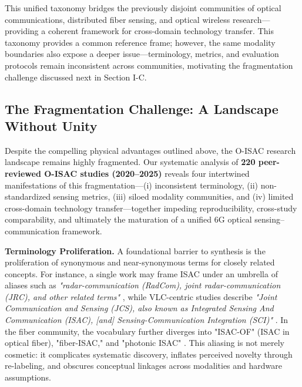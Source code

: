 \documentclass[lettersize,journal]{IEEEtran}
\begin{document}
This unified taxonomy bridges the previously disjoint communities of optical communications, distributed fiber sensing, and optical wireless research---providing a coherent framework for cross-domain technology transfer. This taxonomy provides a common reference frame; however, the same modality boundaries also expose a deeper issue---terminology, metrics, and evaluation protocols remain inconsistent across communities, motivating the fragmentation challenge discussed next in Section I-C.

\subsection{The Fragmentation Challenge: A Landscape Without Unity}

Despite the compelling physical advantages outlined above, the O-ISAC research landscape remains highly fragmented. Our systematic analysis of \textbf{220 peer-reviewed O-ISAC studies (2020--2025)} reveals four intertwined manifestations of this fragmentation---(i) inconsistent terminology, (ii) non-standardized sensing metrics, (iii) siloed modality communities, and (iv) limited cross-domain technology transfer---together impeding reproducibility, cross-study comparability, and ultimately the maturation of a unified 6G optical sensing--communication framework.

\textbf{Terminology Proliferation.} A foundational barrier to synthesis is the proliferation of synonymous and near-synonymous terms for closely related concepts. For instance, a single work may frame ISAC under an umbrella of aliases such as \textit{"radar-communication (RadCom), joint radar-communication (JRC), and other related terms"} \cite{O_ISAC_161}, while VLC-centric studies describe \textit{"Joint Communication and Sensing (JCS), also known as Integrated Sensing And Communication (ISAC), [and] Sensing-Communication Integration (SCI)"} \cite{O_ISAC_068}. In the fiber community, the vocabulary further diverges into "ISAC-OF" (ISAC in optical fiber), "fiber-ISAC," and "photonic ISAC" \cite{O_ISAC_041,O_ISAC_033}. This aliasing is not merely cosmetic: it complicates systematic discovery, inflates perceived novelty through re-labeling, and obscures conceptual linkages across modalities and hardware assumptions.
\end{document}
